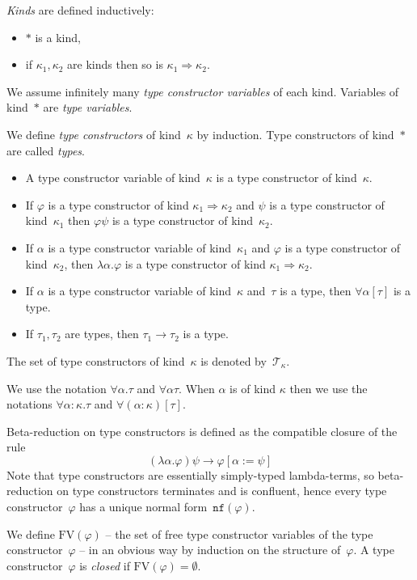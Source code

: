 \documentclass[runningheads,a4paper]{llncs}
\newcommand{\nf}{\mathtt{nf}}
\newcommand{\arrtype}{\rightarrow}
\newcommand{\arrkind}{\Rightarrow}
\newcommand{\FV}{\mathrm{FV}}
\newcommand{\Tc}{\mathcal{T}}
\begin{document}
\begin{definition}\label{def:itypes}\normalfont
  \emph{Kinds} are defined inductively:
  \begin{itemize}
  \item $*$ is a kind,
  \item if $\kappa_1,\kappa_2$ are kinds then so is $\kappa_1 \arrkind
    \kappa_2$.
  \end{itemize}

  We assume infinitely many \emph{type constructor variables} of each
  kind. Variables of kind~$*$ are \emph{type variables}.

  We define \emph{type constructors} of kind~$\kappa$ by induction.
  Type constructors of kind~$*$ are called \emph{types}.
  \begin{itemize}
  \item A type constructor variable of kind~$\kappa$ is a type
    constructor of kind~$\kappa$.
  \item If $\varphi$ is a type constructor of kind $\kappa_1 \arrkind
    \kappa_2$ and $\psi$ is a type constructor of kind~$\kappa_1$ then
    $\varphi \psi$ is a type constructor of kind~$\kappa_2$.
  \item If $\alpha$ is a type constructor variable of kind~$\kappa_1$
    and $\varphi$ is a type constructor of kind~$\kappa_2$, then
    $\lambda\alpha . \varphi$ is a type constructor of kind $\kappa_1
    \arrkind \kappa_2$.
  \item If $\alpha$ is a type constructor variable of kind~$\kappa$
    and~$\tau$ is a type, then $\forall \alpha[\tau]$ is a type.
  \item If $\tau_1,\tau_2$ are types, then $\tau_1 \arrtype \tau_2$ is
    a type.
  \end{itemize}
  The set of type constructors of kind~$\kappa$ is denoted
  by~$\Tc_\kappa$.

  We use the notation $\forall \alpha . \tau$ and $\forall \alpha
  \tau$. When $\alpha$ is of kind $\kappa$ then we use the notations
  $\forall \alpha : \kappa . \tau$ and $\forall (\alpha :
  \kappa)[\tau]$.

  Beta-reduction on type constructors is defined as the compatible
  closure of the rule
  \[
  (\lambda\alpha.\varphi)\psi \to \varphi[\alpha := \psi]
  \]
  Note that type constructors are essentially simply-typed
  lambda-terms, so beta-reduction on type constructors terminates and
  is confluent, hence every type constructor~$\varphi$ has a unique
  normal form~$\nf(\varphi)$.

  We define $\FV(\varphi)$ -- the set of free type constructor
  variables of the type constructor~$\varphi$ -- in an obvious way by
  induction on the structure of~$\varphi$. A type
  constructor~$\varphi$ is \emph{closed} if $\FV(\varphi) =
  \emptyset$.
\end{definition}
\end{document}
